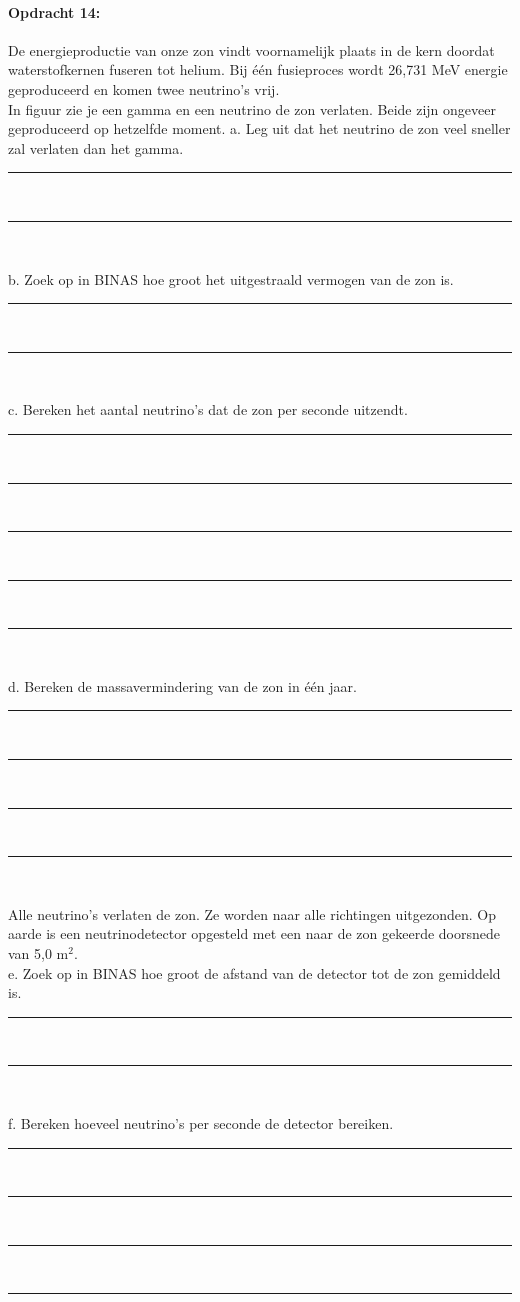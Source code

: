 \paragraph{Opdracht 14:}
De energieproductie van onze zon vindt voornamelijk plaats in de kern doordat 
waterstofkernen fuseren tot helium.
Bij één fusieproces wordt 26,731 \si{MeV} energie geproduceerd en komen 
twee neutrino's vrij.\\
In figuur  zie je een gamma en een neutrino de zon 
verlaten. Beide zijn ongeveer geproduceerd op hetzelfde moment. 
a. Leg uit dat het neutrino de zon veel sneller zal verlaten dan het gamma.
\begin{center}
    \rule{\textwidth}{0.3mm}\\
    \rule{\textwidth}{0.3mm}\\
\end{center} 
b. Zoek op in BINAS hoe groot het uitgestraald vermogen van de zon is.
\begin{center}
    \rule{\textwidth}{0.3mm}\\
    \rule{\textwidth}{0.3mm}\\
\end{center}
c. Bereken het aantal neutrino's dat de zon per seconde uitzendt.
\begin{center}
    \rule{\textwidth}{0.3mm}\\
    \rule{\textwidth}{0.3mm}\\
    \rule{\textwidth}{0.3mm}\\
    \rule{\textwidth}{0.3mm}\\
    \rule{\textwidth}{0.3mm}\\
\end{center}
d. Bereken de massavermindering van de zon in één jaar.
\begin{center}
    \rule{\textwidth}{0.3mm}\\
    \rule{\textwidth}{0.3mm}\\
    \rule{\textwidth}{0.3mm}\\
    \rule{\textwidth}{0.3mm}\\
\end{center}
Alle neutrino's verlaten de zon. Ze worden naar alle richtingen uitgezonden. 
Op aarde is een neutrinodetector opgesteld met een naar de zon gekeerde 
doorsnede van 5,0 m$^{2}$.\\
e. Zoek op in BINAS hoe groot de afstand van de detector tot de zon gemiddeld 
is. \\
\begin{center}
    \rule{\textwidth}{0.3mm}\\
    \rule{\textwidth}{0.3mm}\\
\end{center}
f. Bereken hoeveel neutrino's per seconde de detector bereiken.
\begin{center}
    \rule{\textwidth}{0.3mm}\\
    \rule{\textwidth}{0.3mm}\\
    \rule{\textwidth}{0.3mm}\\
    \rule{\textwidth}{0.3mm}\\
\end{center}
\bigskip{}


